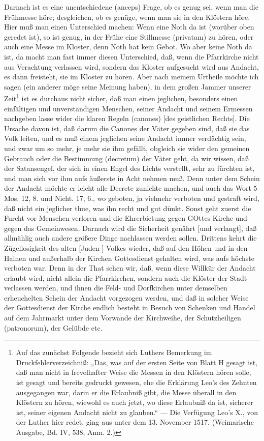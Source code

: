 Darnach ist es eine unentschiedene (anceps) Frage, ob es genug sei, wenn man die Frühmesse höre; desgleichen, ob es genüge, wenn man sie in den Klöstern höre. Hier muß man einen Unterschied machen: Wenn eine Noth da ist (worüber oben geredet ist), so ist genug, in der Frühe eine Stillmesse (privatam) zu hören, oder auch eine Messe im Kloster, denn Noth hat kein Gebot. Wo aber keine Noth da ist, da macht man fast immer diesen Unterschied, daß, wenn die Pfarrkirche nicht aus Verachtung verlassen wird, sondern das Kloster aufgesucht wird aus Andacht, es dann freisteht, sie im Kloster zu hören. Aber nach meinem Urtheile möchte ich sagen (ein anderer möge seine Meinung haben), in dem großen Jammer unserer Zeit\footnote{Auf das zunächst Folgende bezieht sich Luthers Bemerkung im Druckfehlerverzeichniß: „Das, was auf der ersten Seite von Blatt H gesagt ist, daß man nicht in frevelhafter Weise die Messen in den Klöstern hören solle, ist gesagt und bereits gedruckt gewesen, ehe die Erklärung Leo's des Zehnten ausgegangen war, darin er die Erlaubniß gibt, die Messe überall in den Klöstern zu hören, wiewohl es auch jetzt, wo diese Erlaubniß da ist, sicherer ist, seiner eigenen Andacht nicht zu glauben.“ — Die Verfügung Leo's X., von der Luther hier redet, ging aus unter dem 13. November 1517. (Weimarische Ausgabe, Bd. IV, 538, Anm. 2.)} ist es durchaus nicht sicher, daß man einen jeglichen, besonders einen einfältigen und unverständigen Menschen, seiner Andacht und seinem Ermessen nachgeben lasse wider die klaren Regeln (canones) [des geistlichen Rechts]. Die Ursache davon ist, daß darum die Canones der Väter gegeben sind, daß sie das Volk leiten, und es muß einem jeglichen seine Andacht immer verdächtig sein, und zwar um so mehr, je mehr sie ihm gefällt, obgleich sie wider den gemeinen Gebrauch oder die Bestimmung (decretum) der Väter geht, da wir wissen, daß der Satansengel, der sich in einen Engel des Lichts verstellt, sehr zu fürchten ist, und man sich vor ihm aufs äußerste in Acht nehmen muß. Denn unter dem Schein der Andacht möchte er leicht alle Decrete zunichte machen, und auch das Wort 5 Mos. 12, 8. und Nicht. 17, 6., wo geboten, ja vielmehr verboten und gestraft wird, daß nicht ein jeglicher thue, was ihn recht und gut dünkt. Sonst geht zuerst die Furcht vor Menschen verloren und die Ehrerbietung gegen GOttes Kirche und gegen das Gemeinwesen. Darnach wird die Sicherheit genährt [und verlangt], daß allmählig auch andere größere Dinge nachlassen werden sollen. Drittens kehrt die Zügellosigkeit des alten [Juden-] Volkes wieder, daß auf den Höhen und in den Hainen und außerhalb der Kirchen Gottesdienst gehalten wird, was aufs höchste verboten war. Denn in der That sehen wir, daß, wenn diese Willkür der Andacht erlaubt wird, nicht allein die Pfarrkirchen, sondern auch die Klöster der Stadt verlassen werden, und ihnen die Feld- und Dorfkirchen unter demselben erheuchelten Schein der Andacht vorgezogen werden, und daß in solcher Weise der Gottesdienst
der Kirche endlich besteht in Besuch von Schenken und Handel auf dem Jahrmarkt unter dem Vorwande der Kirchweihe, der Schutzheiligen (patronorum), der Gelübde etc.

